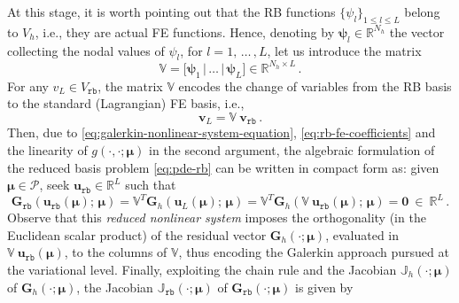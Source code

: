 \documentclass{elsarticle}
\numberwithin{equation}{section}
\theoremstyle{theorem}
\theoremstyle{definition}
\theoremstyle{remark}
\theoremstyle{proposition}
\numberwithin{figure}{section}
\newcommand{\bg}[1]{\boldsymbol{#1}}
\begin{document}
		At this stage, it is worth pointing out that the RB functions $\big\lbrace \psi_l \big\rbrace_{1 \leq l \leq L}$ belong to $V_h$, i.e., they are actual FE functions. Hence, denoting by $\bg{\psi}_l \in \mathbb{R}^{N_h}$ the vector collecting the nodal values of $\psi_l$, for $l = 1, \, \ldots \, , L$, let us introduce the matrix \[ \mathbb{V} = \big[ \bg{\psi}_1 \, \big| \, \ldots \, \big| \, \bg{\psi}_L \big] \in \mathbb{R}^{{N_h} \times L} \, .\] For any $v_{L} \in V_{\texttt{rb}}$, the matrix $\mathbb{V}$ encodes the change of variables from the RB basis to the standard (Lagrangian) FE basis, i.e.,
		\begin{equation}
			\label{eq:rb-fe-coefficients}
			\mathbf{v}_L = \mathbb{V} ~ \mathbf{v}_{\texttt{rb}} \, .
		\end{equation}
		Then, due to \eqref{eq:galerkin-nonlinear-system-equation}, \eqref{eq:rb-fe-coefficients} and the linearity of $g(\cdot,\cdot; \bg{\mu})$ in the second argument, the algebraic formulation of the reduced basis problem \eqref{eq:pde-rb} can be written in compact form as: given $\bg{\mu} \in \mathcal{P}$, seek $\mathbf{u}_{\texttt{rb}} \in \mathbb{R}^L$ such that
		\begin{equation}
			\label{eq:rb-nonlinear-system}
			\mathbf{G}_{\texttt{rb}}(\mathbf{u}_{\texttt{rb}}(\bg{\mu}); \, \bg{\mu}) = \mathbb{V}^T \mathbf{G}_h(\mathbf{u}_L(\bg{\mu}); \, \bg{\mu}) = \mathbb{V}^T \mathbf{G}_h(\mathbb{V} ~ \mathbf{u}_{\texttt{rb}}(\bg{\mu}); \, \bg{\mu}) = \bg{0} ~ \in ~ \mathbb{R}^L \, .
		\end{equation}
		Observe that this \emph{reduced nonlinear system} imposes the orthogonality (in the Euclidean scalar product) of the residual vector $\mathbf{G}_h(\cdot; \bg{\mu})$, evaluated in $\mathbb{V} ~ \mathbf{u}_{\texttt{rb}}(\bg{\mu})$, to the columns of $\mathbb{V}$, thus encoding the Galerkin approach pursued at the variational level. Finally, exploiting the chain rule and the Jacobian $\mathbb{J}_h(\cdot; \bg{\mu})$ of $\mathbf{G}_h(\cdot; \bg{\mu})$, the Jacobian $\mathbb{J}_{\texttt{rb}}(\cdot; \bg{\mu})$ of $\mathbf{G}_{\texttt{rb}}(\cdot; \bg{\mu})$ is given by
\end{document}
